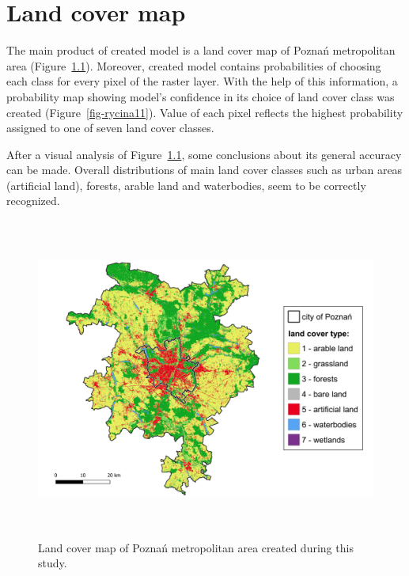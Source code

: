 \documentclass{amuthesis}
\begin{document}

\hypertarget{sec-results-map}{%
\chapter{Land cover map}\label{sec-results-map}}

The main product of created model is a land cover map of Poznań
metropolitan area (Figure~\ref{fig-rycina9}). Moreover, created model
contains probabilities of choosing each class for every pixel of the
raster layer. With the help of this information, a probability map
showing model's confidence in its choice of land cover class was created
(Figure~\ref{fig-rycina11}). Value of each pixel reflects the highest
probability assigned to one of seven land cover classes.

After a visual analysis of Figure~\ref{fig-rycina9}, some conclusions
about its general accuracy can be made. Overall distributions of main
land cover classes such as urban areas (artificial land), forests,
arable land and waterbodies, seem to be correctly recognized.

\begin{figure}[H]

{\centering \includegraphics[width=5.875in,height=4.16667in]{./figures/result_map-lc.png}

}

\caption{\label{fig-rycina9}Land cover map of Poznań metropolitan area
created during this study.}

\end{figure}
\end{document}
